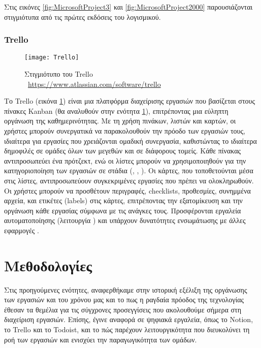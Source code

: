                 Στις εικόνες \ref{fig:MicrosoftProject3} και \ref{fig:MicrosoftProject2000} παρουσιάζονται στιγμιότυπα από τις πρώτες εκδόσεις του λογισμικού.

            \subsubsection{Trello}
                \begin{figure}[h!] \noindent \centering
                    \texttt{[image: Trello]}
                    \caption{Στιγμιότυπο του Trello \\ {\footnotesize \textcopyright\ \url{https://www.atlassian.com/software/trello}}}
                    \label{fig:Trello}
                \end{figure}

                Το Trello (εικόνα \ref{fig:Trello}) είναι μια πλατφόρμα διαχείρισης εργασιών που βασίζεται στους πίνακες Kanban (θα αναλυθούν στην ενότητα \ref{sec:methodologies}), επιτρέποντας μια εύληπτη οργάνωση της καθημερινότητας. Με τη χρήση πινάκων, λιστών και καρτών, οι χρήστες μπορούν συνεργατικά να παρακολουθούν την πρόοδο των εργασιών τους, ιδιαίτερα για εργασίες που χρειάζονται ομαδική συνεργασία, καθιστώντας το ιδιαίτερα δημοφιλές σε ομάδες όλων των μεγεθών και σε διάφορους τομείς. Κάθε πίνακας αντιπροσωπεύει ένα πρότζεκτ, ενώ οι λίστες μπορούν να χρησιμοποιηθούν για την κατηγοριοποίηση των εργασιών σε στάδια (, , ). Οι κάρτες, που τοποθετούνται μέσα στις λίστες, αντιπροσωπεύουν συγκεκριμένες εργασίες που πρέπει να ολοκληρωθούν. Οι χρήστες μπορούν να προσθέτουν περιγραφές, checklists, προθεσμίες, συνημμένα αρχεία, και ετικέτες (labels) στις κάρτες, επιτρέποντας την εξατομίκευση και την οργάνωση κάθε εργασίας σύμφωνα με τις ανάγκες τους. Προσφέρονται εργαλεία αυτοματοποίησης (λειτουργία ) και υπάρχουν δυνατότητες ενσωμάτωσης με άλλες εφαρμογές \cite{Trello}.


    \section{Μεθοδολογίες} \label{sec:methodologies}
        Στις προηγούμενες ενότητες, αναφερθήκαμε στην ιστορική εξέλιξη της οργάνωσης των εργασιών και του χρόνου μας και το πως η ραγδαία πρόοδος της τεχνολογίας έθεσαν τα θεμέλια για τις σύγχρονες προσεγγίσεις που ακολουθούμε σήμερα στη διαχείριση εργασιών. Επίσης, έγινε αναφορά σε ψηφιακά εργαλεία, όπως το Notion, το Trello και το Todoist, και το πώς παρέχουν λειτουργικότητα που διευκολύνει τη ροή των εργασιών και ενισχύει την παραγωγικότητα των ομάδων.

